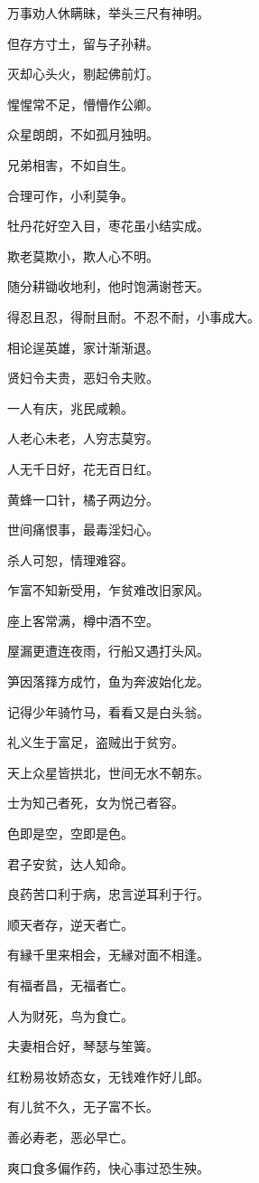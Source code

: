 \documentclass[12pt,oneside]{book}
\begin{document}
万事劝人休瞒昧，举头三尺有神明。

但存方寸土，留与子孙耕。

灭却心头火，剔起佛前灯。

惺惺常不足，懵懵作公卿。

众星朗朗，不如孤月独明。

兄弟相害，不如自生。

合理可作，小利莫争。

牡丹花好空入目，枣花虽小结实成。

欺老莫欺小，欺人心不明。

随分耕锄收地利，他时饱满谢苍天。

得忍且忍，得耐且耐。不忍不耐，小事成大。

相论逞英雄，家计渐渐退。

贤妇令夫贵，恶妇令夫败。

一人有庆，兆民咸赖。

人老心未老，人穷志莫穷。

人无千日好，花无百日红。

黄蜂一口针，橘子两边分。

世间痛恨事，最毒淫妇心。

杀人可恕，情理难容。

乍富不知新受用，乍贫难改旧家风。

座上客常满，樽中酒不空。

屋漏更遭连夜雨，行船又遇打头风。

笋因落箨方成竹，鱼为奔波始化龙。

记得少年骑竹马，看看又是白头翁。

礼义生于富足，盗贼出于贫穷。

天上众星皆拱北，世间无水不朝东。

士为知己者死，女为悦己者容。

色即是空，空即是色。

君子安贫，达人知命。

良药苦口利于病，忠言逆耳利于行。

顺天者存，逆天者亡。

有縁千里来相会，无縁对面不相逢。

有福者昌，无福者亡。

人为财死，鸟为食亡。

夫妻相合好，琴瑟与笙簧。

红粉易妆娇态女，无钱难作好儿郎。

有儿贫不久，无子富不长。

善必寿老，恶必早亡。

爽口食多偏作药，快心事过恐生殃。
\end{document}
